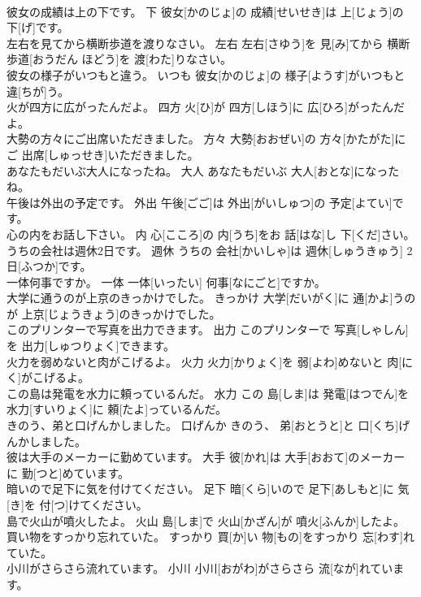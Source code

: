 \documentclass[8pt]{extreport}
\begin{document}
\begin{CJK}{UTF8}{min}
\\	彼女の成績は上の下です。	下	彼女[かのじょ]の 成績[せいせき]は 上[じょう]の 下[げ]です。	
\\	左右を見てから横断歩道を渡りなさい。	左右	左右[さゆう]を 見[み]てから 横断歩道[おうだん ほどう]を 渡[わた]りなさい。	
\\	彼女の様子がいつもと違う。	いつも	彼女[かのじょ]の 様子[ようす]がいつもと 違[ちが]う。	
\\	火が四方に広がったんだよ。	四方	火[ひ]が 四方[しほう]に 広[ひろ]がったんだよ。	
\\	大勢の方々にご出席いただきました。	方々	大勢[おおぜい]の 方々[かたがた]にご 出席[しゅっせき]いただきました。	
\\	あなたもだいぶ大人になったね。	大人	あなたもだいぶ 大人[おとな]になったね。	
\\	午後は外出の予定です。	外出	午後[ごご]は 外出[がいしゅつ]の 予定[よてい]です。	
\\	心の内をお話し下さい。	内	心[こころ]の 内[うち]をお 話[はな]し 下[くだ]さい。	
\\	うちの会社は週休2日です。	週休	うちの 会社[かいしゃ]は 週休[しゅうきゅう] 2日[ふつか]です。	
\\	一体何事ですか。	一体	一体[いったい] 何事[なにごと]ですか。	
\\	大学に通うのが上京のきっかけでした。	きっかけ	大学[だいがく]に 通[かよ]うのが 上京[じょうきょう]のきっかけでした。	
\\	このプリンターで写真を出力できます。	出力	このプリンターで 写真[しゃしん]を 出力[しゅつりょく]できます。	
\\	火力を弱めないと肉がこげるよ。	火力	火力[かりょく]を 弱[よわ]めないと 肉[にく]がこげるよ。	
\\	この島は発電を水力に頼っているんだ。	水力	この 島[しま]は 発電[はつでん]を 水力[すいりょく]に 頼[たよ]っているんだ。	
\\	きのう、弟と口げんかしました。	口げんか	きのう、 弟[おとうと]と 口[くち]げんかしました。	
\\	彼は大手のメーカーに勤めています。	大手	彼[かれ]は 大手[おおて]のメーカーに 勤[つと]めています。	
\\	暗いので足下に気を付けてください。	足下	暗[くら]いので 足下[あしもと]に 気[き]を 付[つ]けてください。	
\\	島で火山が噴火したよ。	火山	島[しま]で 火山[かざん]が 噴火[ふんか]したよ。	
\\	買い物をすっかり忘れていた。	すっかり	買[か]い 物[もの]をすっかり 忘[わす]れていた。	
\\	小川がさらさら流れています。	小川	小川[おがわ]がさらさら 流[なが]れています。	

\end{CJK}
\end{document}
